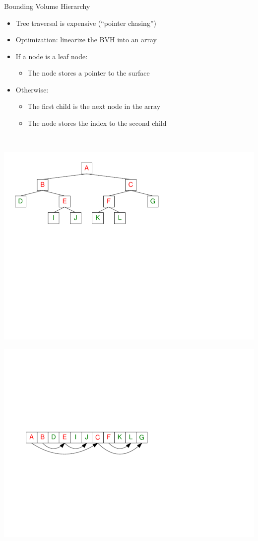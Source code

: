 \documentclass[utf8,stillsansserifmath,fleqn,t]{beamer}
\begin{document}
\begin{frame}[label=bvh-2]
\frametitle{\insertsection}
Bounding Volume Hierarchy
\begin{itemize}
\item Tree traversal is expensive (``pointer chasing'')
\item Optimization: linearize the BVH into an array
\item If a node is a leaf node:
    \begin{itemize}
    \item The node stores a pointer to the surface
    \end{itemize}
\item Otherwise:
    \begin{itemize}
    \item The first child is the next node in the array
    \item The node stores the index to the second child
    \end{itemize}
\end{itemize}
~\\
\begin{minipage}{.49\textwidth}
\centerline{\includegraphics[width=\textwidth]{./fig/bvh-flattening-0.pdf}}
\end{minipage}\hfill
\begin{minipage}{.49\textwidth}
\centerline{\includegraphics[width=\textwidth]{./fig/bvh-flattening-1.pdf}}

\end{minipage}
\end{frame}
\end{document}
